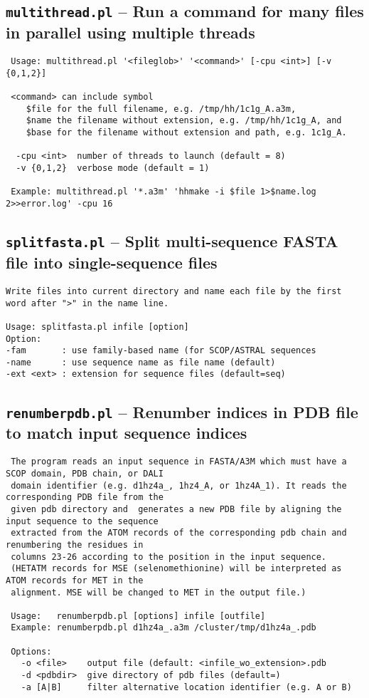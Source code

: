 \documentclass[11pt,a4paper]{article}
\begin{document}
\subsection{{\tt multithread.pl} -- Run a command for many files in parallel using multiple threads}

\small 
\begin{verbatim}
 Usage: multithread.pl '<fileglob>' '<command>' [-cpu <int>] [-v {0,1,2}]

 <command> can include symbol 
    $file for the full filename, e.g. /tmp/hh/1c1g_A.a3m, 
    $name the filename without extension, e.g. /tmp/hh/1c1g_A, and 
    $base for the filename without extension and path, e.g. 1c1g_A.

  -cpu <int>  number of threads to launch (default = 8)
  -v {0,1,2}  verbose mode (default = 1)

 Example: multithread.pl '*.a3m' 'hhmake -i $file 1>$name.log 2>>error.log' -cpu 16
\end{verbatim} 
\normalsize

\subsection{{\tt splitfasta.pl} -- Split multi-sequence FASTA file into single-sequence files}
\small 
\begin{verbatim}
Write files into current directory and name each file by the first word after ">" in the name line. 

Usage: splitfasta.pl infile [option]
Option:
-fam       : use family-based name (for SCOP/ASTRAL sequences
-name      : use sequence name as file name (default)
-ext <ext> : extension for sequence files (default=seq)
\end{verbatim} 
\normalsize

\subsection{{\tt renumberpdb.pl} -- Renumber indices in PDB file to match input sequence indices}

\small 
\begin{verbatim}
 The program reads an input sequence in FASTA/A3M which must have a SCOP domain, PDB chain, or DALI 
 domain identifier (e.g. d1hz4a_, 1hz4_A, or 1hz4A_1). It reads the corresponding PDB file from the 
 given pdb directory and  generates a new PDB file by aligning the input sequence to the sequence 
 extracted from the ATOM records of the corresponding pdb chain and renumbering the residues in 
 columns 23-26 according to the position in the input sequence.
 (HETATM records for MSE (selenomethionine) will be interpreted as ATOM records for MET in the 
 alignment. MSE will be changed to MET in the output file.)
 
 Usage:   renumberpdb.pl [options] infile [outfile] 
 Example: renumberpdb.pl d1hz4a_.a3m /cluster/tmp/d1hz4a_.pdb 

 Options: 
   -o <file>    output file (default: <infile_wo_extension>.pdb
   -d <pdbdir>  give directory of pdb files (default=)
   -a [A|B]     filter alternative location identifier (e.g. A or B)
\end{verbatim} 
\normalsize
\end{document}

